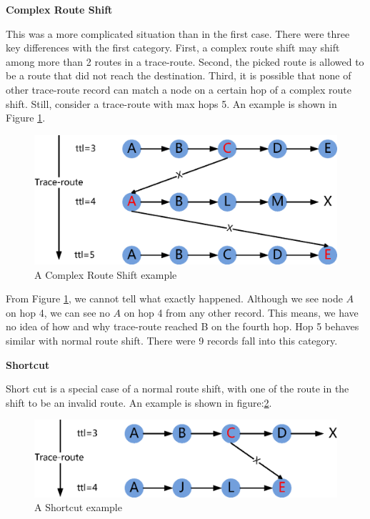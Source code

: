 \documentclass[conference, twocolumn, oneside, 10pt]{IEEEtran}
\begin{document}
\textbf{Complex Route Shift}

This was a more complicated situation than in the first case. There were three key differences with the first category. First, a complex route shift may shift among more than 2 routes in a trace-route. Second, the picked route is allowed to be a route that did not reach the destination. Third, it is possible that none of other trace-route record can match a node on a certain hop of a complex route shift. Still, consider a trace-route with max hops 5. An example is shown in Figure \ref{fig:ComplexRouteShift}.

\begin{figure}[h!]
  \centering
  \includegraphics[scale=0.5]{plot/ComplexRouteShift.eps}
  \caption{A Complex Route Shift example}
  \label{fig:ComplexRouteShift}
\end{figure}

From Figure \ref{fig:ComplexRouteShift}, we cannot tell what exactly happened. Although we see node $A$ on hop 4, we can see no $A$ on hop 4 from any other record. This means, we have no idea of how and why trace-route reached B on the fourth hop. Hop 5 behaves similar with normal route shift. There were 9 records fall into this category.

\textbf{Shortcut}

Short cut is a special case of a normal route shift, with one of the route in the shift to be an invalid route. An example is shown in figure:\ref{fig:Shortcut}.

\begin{figure}[h!]
  \centering
  \includegraphics[scale=0.5]{plot/Shortcut.eps}
  \caption{A Shortcut example}
  \label{fig:Shortcut}
\end{figure}
\end{document}
